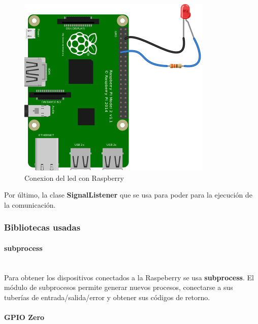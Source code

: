 {\begin{figure}[p]
    \centering
    \includegraphics[width=\linewidth]{imagenes/led_bb.png}
    \caption{Conexion del led con Raspberry \cite{raspberry-led}}
    \label{fig:figure12}
\end{figure}

Por último, la clase \textbf{SignalListener} que se usa para poder para la ejecución de la comunicación. \\

\subsubsection{Bibliotecas usadas}

\paragraph{subprocess} \hspace{0pt} \\

Para obtener los dispositivos conectados a la Raspeberry se usa \textbf{subprocess}. El módulo de subprocesos permite generar nuevos procesos, conectarse a sus tuberías de entrada/salida/error y obtener sus códigos de retorno. \cite{subprocess}

\paragraph{GPIO Zero} \hspace{0pt} \\

}
